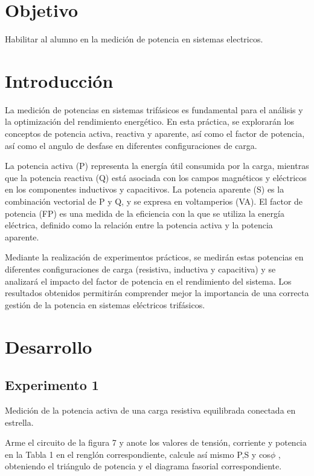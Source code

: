 \documentclass[12pt, letterpaper]{article}
\begin{document}

\section{Objetivo}

Habilitar al alumno en la medición de potencia en sistemas electricos.

\section{Introducción}

La medición de potencias en sistemas trifásicos es fundamental para el análisis y la optimización del rendimiento energético. En esta práctica, se explorarán los conceptos de potencia activa, reactiva y aparente, así como el factor de potencia, así como el angulo de desfase en diferentes configuraciones de carga.

La potencia activa (P) representa la energía útil consumida por la carga, mientras que la potencia reactiva (Q) está asociada con los campos magnéticos y eléctricos en los componentes inductivos y capacitivos. La potencia aparente (S) es la combinación vectorial de P y Q, y se expresa en voltamperios (VA). El factor de potencia (FP) es una medida de la eficiencia con la que se utiliza la energía eléctrica, definido como la relación entre la potencia activa y la potencia aparente.

Mediante la realización de experimentos prácticos, se medirán estas potencias en diferentes configuraciones de carga (resistiva, inductiva y capacitiva) y se analizará el impacto del factor de potencia en el rendimiento del sistema. Los resultados obtenidos permitirán comprender mejor la importancia de una correcta gestión de la potencia en sistemas eléctricos trifásicos.

\section{Desarrollo}

\subsection{Experimento 1}

Medición  de  la  potencia  activa  de  una  carga  resistiva  equilibrada  conectada  en estrella.

Arme  el  circuito  de  la  figura  7  y  anote  los  valores de  tensión,  corriente  y  potencia en  la  Tabla  1  en  el  renglón
correspondiente,  calcule  así  mismo  P,S  y  cos\(\phi\) ,  obteniendo  el triángulo  de  potencia  y  el diagrama  fasorial  correspondiente.
\end{document}
